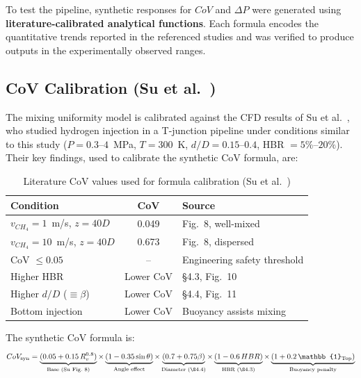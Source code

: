\documentclass[12pt, a4paper]{report}
\begin{document}
To test the pipeline, synthetic responses for $CoV$ and $\Delta P$ were generated using \textbf{literature-calibrated analytical functions}. Each formula encodes the quantitative trends reported in the referenced studies and was verified to produce outputs in the experimentally observed ranges.

\subsection{CoV Calibration (Su et al.~\cite{Su2022})}

The mixing uniformity model is calibrated against the CFD results of Su et al.~\cite{Su2022}, who studied hydrogen injection in a T-junction pipeline under conditions similar to this study ($P = 0.3$--$4$~MPa, $T = 300$~K, $d/D = 0.15$--$0.4$, HBR $= 5\%$--$20\%$). Their key findings, used to calibrate the synthetic CoV formula, are:

\begin{table}[H]
\centering
\caption{Literature CoV values used for formula calibration (Su et al.~\cite{Su2022})}
\label{tab:cov_calibration}
\begin{tabular}{@{}lcl@{}}
\toprule
\textbf{Condition} & \textbf{CoV} & \textbf{Source} \\ \midrule
$v_{CH_4} = 1$~m/s, $z = 40D$ & 0.049 & Fig.~8, well-mixed \\
$v_{CH_4} = 10$~m/s, $z = 40D$ & 0.673 & Fig.~8, dispersed \\
CoV $\leq 0.05$ & -- & Engineering safety threshold \\
Higher HBR & Lower CoV & \S4.3, Fig.~10 \\
Higher $d/D$ ($\equiv \beta$) & Lower CoV & \S4.4, Fig.~11 \\
Bottom injection & Lower CoV & Buoyancy assists mixing \\
\bottomrule
\end{tabular}
\end{table}

\noindent The synthetic CoV formula is:
\begin{equation}
    CoV_{\text{syn}} = \underbrace{(0.05 + 0.15\,R_v^{0.8})}_{\text{Base (Su Fig.~8)}} \times \underbrace{(1 - 0.35\sin\theta)}_{\text{Angle effect}} \times \underbrace{(0.7 + 0.75\beta)}_{\text{Diameter (\S4.4)}} \times \underbrace{(1 - 0.6\,HBR)}_{\text{HBR (\S4.3)}} \times \underbrace{(1 + 0.2\,\mathbb{1}_{\text{Top}})}_{\text{Buoyancy penalty}}
    \label{eq:cov_syn}
\end{equation}
\end{document}
